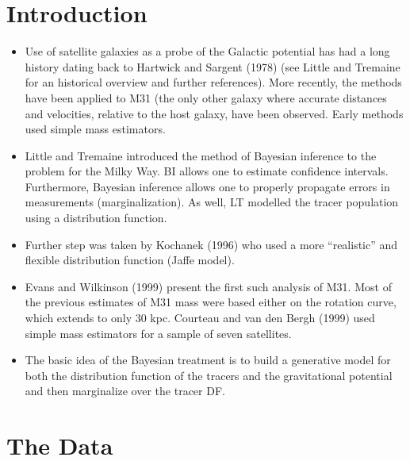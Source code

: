 \documentclass[preprint]{aastex}
\begin{document}



\section{Introduction}

\begin{itemize}

\item Use of satellite galaxies as a probe of the Galactic potential
has had a long history dating back to Hartwick and Sargent (1978) (see
Little and Tremaine for an historical overview and further
references).  More recently, the methods have been applied to M31 (the
only other galaxy where accurate distances and velocities, relative to
the host galaxy, have been observed.  Early methods used simple mass
estimators.

\item Little and Tremaine introduced the method of Bayesian inference
to the problem for the Milky Way.  BI allows one to estimate
confidence intervals.  Furthermore, Bayesian inference allows one to
properly propagate errors in measurements (marginalization).  As well,
LT modelled the tracer population using a distribution function.

\item Further step was taken by Kochanek (1996) who used a more ``realistic''
and flexible distribution function (Jaffe model).

\item Evans and Wilkinson (1999) present the first such analysis of
M31.  Most of the previous estimates of M31 mass were based either on
the rotation curve, which extends to only 30 kpc.  Courteau and van
den Bergh (1999) used simple mass estimators for a sample of seven
satellites.

\item The basic idea of the Bayesian treatment is to build a
generative model for both the distribution function of the tracers and
the gravitational potential and then marginalize over the tracer DF.

\end{itemize}

\section{The Data}
\end{document}
